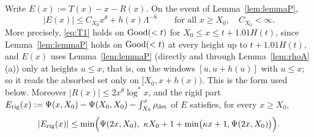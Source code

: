 \begin{lemma}\label{lem:T1}
Write $E(x):=T(x)-x-R(x)$. On the event of Lemma~\ref{lem:lemmaP},
\begin{equation}\label{eq:T1}
  |E(x)|\le C_{X_0}x^{\theta}+h(x)\Lambda^{-8}\qquad\text{for all }x\ge X_0,\quad C_{X_0}<\infty.
\end{equation}
More precisely, \eqref{eq:T1} holds on $\mathrm{Good}(<t)$ for $X_0\le x\le t+1.01H(t)$, since Lemma~\ref{lem:lemmaP} holds on
$\mathrm{Good}(<t)$ at every height up to $t+1.01H(t)$, and $E(x)$ uses Lemma~\ref{lem:lemmaP} (directly and through
Lemma~\ref{lem:rhoA}(a)) only at heights $u\le x$, that is, on the windows $[u,u+h(u)]$ with $u\le x$; so it reads the
absorbed set only on $[X_0,x+h(x))$. This is the form used below.
Moreover $|R(x)|\le2x^{\theta}\log^*x$, and the rigid part $E_{\mathrm{rig}}(x):=\Psi(x,X_0)-\Psi(X_0,X_0)-\int_{X_0}^x\rho_{\mathrm{det}}$ of $E$
satisfies, for every $x\ge X_0$,
\begin{equation}\label{eq:Erig}
  |E_{\mathrm{rig}}(x)|\le\min\Bigl(\Psi(2x,X_0),\ \kappa X_0+1+\min\bigl(\kappa x+1,\Psi(2x,X_0)\bigr)\Bigr).
\end{equation}
\end{lemma}
